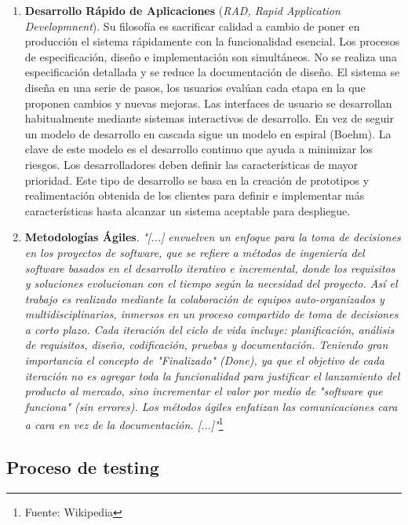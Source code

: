 \begin{enumerate}
\item \textbf{Desarrollo Rápido de Aplicaciones} (\emph{RAD, Rapid 
Application Developmnent}). Su filosofía es sacrificar calidad a 
cambio de poner en producción el sistema rápidamente con la funcionalidad 
esencial. Los procesos de especificación, diseño e implementación son 
simultáneos. No se realiza una especificación detallada y se reduce la 
documentación de diseño. El sistema se diseña en una serie de pasos, los 
usuarios evalúan cada etapa en la que proponen cambios y nuevas mejoras. Las 
interfaces de usuario se desarrollan habitualmente mediante sistemas 
interactivos de desarrollo. En vez de seguir un modelo de desarrollo en 
cascada sigue un modelo en espiral (Boehm). La clave de 
este modelo es el desarrollo continuo que ayuda a minimizar los riesgos. Los 
desarrolladores deben definir las características de mayor prioridad. Este 
tipo de desarrollo se basa en la creación de prototipos y realimentación 
obtenida de los clientes para definir e implementar más características hasta 
alcanzar un sistema aceptable para despliegue.

\item \textbf{Metodologías Ágiles}. \emph{"[...] envuelven un enfoque para la 
toma de decisiones en los proyectos de software, que se refiere a métodos de 
ingeniería del software basados en el desarrollo iterativo e incremental, 
donde los requisitos y soluciones evolucionan con el tiempo según la 
necesidad del proyecto. Así el trabajo es realizado mediante la colaboración 
de equipos auto-organizados y multidisciplinarios, inmersos en un proceso 
compartido de toma de decisiones a corto plazo. Cada iteración del ciclo de 
vida incluye:  planificación, análisis de requisitos, diseño, codificación, 
pruebas y  documentación. Teniendo gran importancia el concepto de 
"Finalizado" (Done), ya que el objetivo de cada iteración no es agregar toda 
la funcionalidad para justificar el lanzamiento del producto al mercado, sino 
incrementar el valor por medio de "software que funciona" (sin errores). Los 
métodos ágiles enfatizan las comunicaciones cara a cara en vez de la 
documentación. [...]"}\footnote{Fuente: Wikipedia}
\end{enumerate}

\subsection{Proceso de testing}

